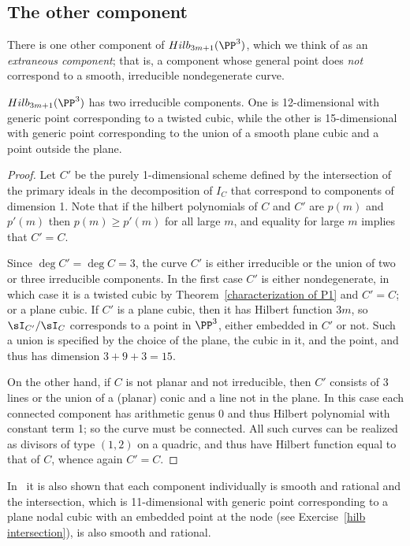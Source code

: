 \subsection{The other component}

There is  one other component of $Hilb_{3m+1}(\PP^3)$, which we think of as an \emph{extraneous component}; that is, a component whose general point does \emph{not} correspond to a smooth, irreducible nondegenerate curve. 

\begin{theorem}
$Hilb_{3m+1}(\PP^3)$ has two irreducible components. One is 12-dimensional with generic point corresponding to  a twisted cubic,
while the other is 15-dimensional with generic point corresponding to the union of a smooth plane cubic and a point outside the plane.
\end{theorem}

\begin{proof}
Let $C'$ be the purely 1-dimensional scheme defined by the intersection of the primary ideals in the decomposition of $I_C$ that correspond to
components of dimension 1. Note that if the hilbert polynomials of $C$ and $C'$ are $p(m)$ and  $p'(m)$ then
$p(m) \geq p'(m)$ for all large $m$, and equality for large $m$ implies that $C'=C$.

Since $\deg C' = \deg C = 3$, the curve $C'$ is either irreducible or the union of two or three irreducible components. In the first case $C'$ is either nondegenerate, in which case it is a twisted cubic by Theorem~\ref{characterization of P1} and $C' = C$; or a plane cubic. If $C'$ is a plane cubic, then it has Hilbert function $3m$, so $\sI_{C'}/\sI_C$
corresponds to a point in $\PP^3$, either embedded in $C'$ or not. Such a union is specified by the choice of the
plane, the cubic in it, and the point, and thus has dimension $3 + 9+3 = 15.$

On the other hand, if $C$ is not planar and not irreducible, then $C'$ consists of 3 lines or the union of a (planar) conic
and a line not in the plane. In this case each connected component has arithmetic genus 0 and thus Hilbert polynomial
with constant term 1; so the curve must be connected. All such curves can be realized as divisors of type $(1,2)$
on a quadric, and thus have Hilbert function equal to that of $C$, whence again $C' = C$.
\end{proof}


In~\cite{Piene-Schlessinger} it is also shown that each component individually is smooth and rational and the intersection,
which is 11-dimensional with generic point corresponding to a plane nodal cubic  with an embedded point at the node (see Exercise~\ref{hilb intersection}), is also
smooth and rational. 


